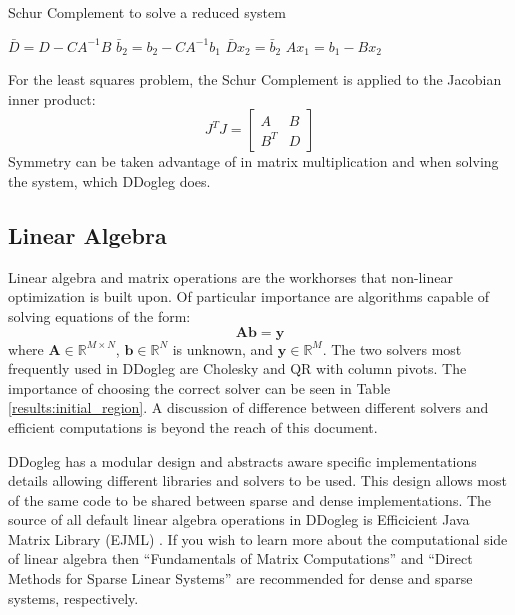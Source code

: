 \documentclass[peerreview,compsoc,onecolumn]{IEEEtran}
\newcommand{\R}{\mathbb{R}}
\begin{document}
\begin{algorithm}{}
\caption{\label{alg:schur_complement}Schur Complement to solve a reduced system}
\begin{algorithmic}[1]
	\State $\bar{D} = D - C A^{-1} B$
	\State $\bar{b}_2 = b_2 - C A^{-1} b_1$  
	\State $\bar{D} x_2 = \bar{b}_2$         
	\State $A x_1 = b_1 - B x_2$
\end{algorithmic}
\end{algorithm}

For the least squares problem, the Schur Complement is applied to the Jacobian inner product:
\begin{equation}
J^T J =
\begin{bmatrix}
A & B \\
B^T & D
\end{bmatrix}
\end{equation}
Symmetry can be taken advantage of in matrix multiplication and when solving the system, which DDogleg does.

\subsection{Linear Algebra}

Linear algebra and matrix operations are the workhorses that non-linear optimization is built upon. Of particular importance are algorithms capable of solving equations of the form:
\begin{equation}
\bm{A}\bm{b} = \bm{y}
\end{equation}
where $\bm{A} \in \R^{M \times N}$, $\bm{b} \in \R^N$ is unknown, and $\bm{y} \in \R^M$. The two solvers most frequently used in DDogleg are Cholesky and QR with column pivots. The importance of choosing the correct solver can be seen in Table \ref{results:initial_region}. A discussion of difference between different solvers and efficient computations is beyond the reach of this document.

DDogleg has a modular design and abstracts aware specific implementations details allowing different libraries and solvers to be used. This design allows most of the same code to be shared between sparse and dense implementations. The source of all default linear algebra operations in DDogleg is Efficicient Java Matrix Library (EJML) \cite{ejml2018}. If you wish to learn more about the computational side of linear algebra then ``Fundamentals of Matrix Computations'' \cite{watkins2010} and ``Direct Methods for Sparse Linear Systems'' \cite{davis2006} are recommended for dense and sparse systems, respectively.
\end{document}

